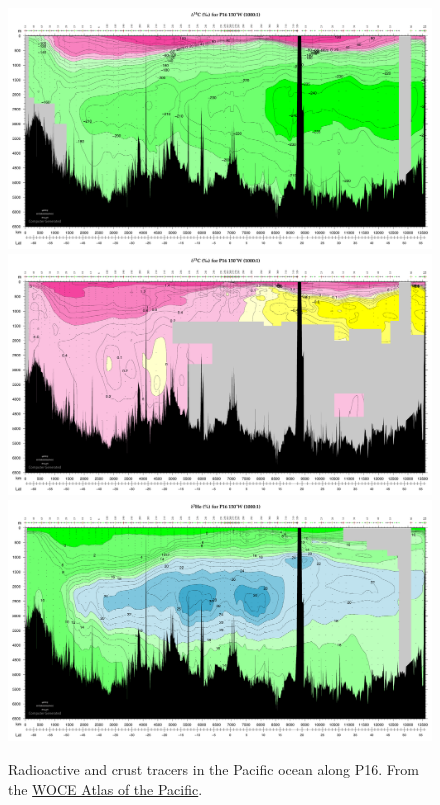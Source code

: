 \begin{figure}[hbt]
  \begin{center}
    \includegraphics{figs/WaterMasses/P16DC14Crop}
    \includegraphics{figs/WaterMasses/P16dC13Crop}
    \includegraphics{figs/WaterMasses/P16d3HeCrop}
    \caption{Radioactive and crust tracers in the Pacific ocean along P16.  From the \href{http://whp-atlas.ucsd.edu/pacific_index.html}{WOCE Atlas of the Pacific}. }
    \label{fig:P16Radioactive}  
  \end{center}
\end{figure}

